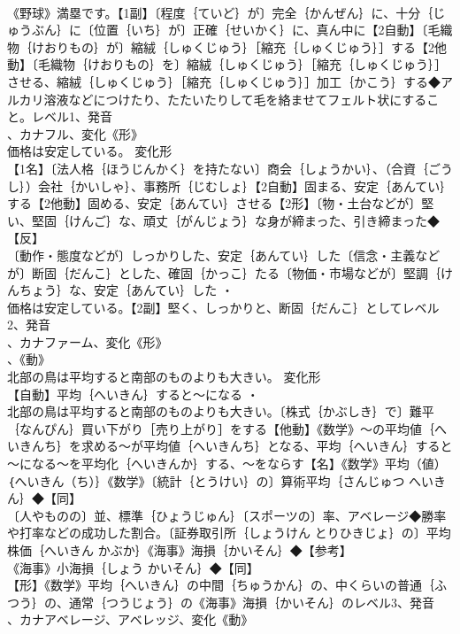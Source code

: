 \documentclass[8pt]{extreport}
\begin{document}
\begin{CJK}{UTF8}{min}
\\	《野球》満塁です。【1副】〔程度｛ていど｝が〕完全｛かんぜん｝に、十分｛じゅうぶん｝に〔位置｛いち｝が〕正確｛せいかく｝に、真ん中に【2自動】〔毛織物｛けおりもの｝が〕縮絨｛しゅくじゅう｝［縮充｛しゅくじゅう｝］する【2他動】〔毛織物｛けおりもの｝を〕縮絨｛しゅくじゅう｝［縮充｛しゅくじゅう｝］させる、縮絨｛しゅくじゅう｝［縮充｛しゅくじゅう｝］加工｛かこう｝する◆アルカリ溶液などにつけたり、たたいたりして毛を絡ませてフェルト状にすること。レベル1、発音
\\	、カナフル、変化《形》
\\	価格は安定している。	変化形 
\\	【1名】〔法人格｛ほうじんかく｝を持たない〕商会｛しょうかい｝、（合資｛ごうし｝）会社｛かいしゃ｝、事務所｛じむしょ｝【2自動】固まる、安定｛あんてい｝する【2他動】固める、安定｛あんてい｝させる【2形】〔物・土台などが〕堅い、堅固｛けんご｝な、頑丈｛がんじょう｝な身が締まった、引き締まった◆【反】
\\	〔動作・態度などが〕しっかりした、安定｛あんてい｝した〔信念・主義などが〕断固｛だんこ｝とした、確固｛かっこ｝たる〔物価・市場などが〕堅調｛けんちょう｝な、安定｛あんてい｝した ・
\\	価格は安定している。【2副】堅く、しっかりと、断固｛だんこ｝としてレベル2、発音
\\	、カナファーム、変化《形》
\\	、《動》
\\	北部の鳥は平均すると南部のものよりも大きい。	変化形 
\\	【自動】平均｛へいきん｝すると～になる ・
\\	北部の鳥は平均すると南部のものよりも大きい。〔株式｛かぶしき｝で〕難平｛なんぴん｝買い下がり［売り上がり］をする【他動】《数学》～の平均値｛へいきんち｝を求める～が平均値｛へいきんち｝となる、平均｛へいきん｝すると～になる～を平均化｛へいきんか｝する、～をならす【名】《数学》平均（値）｛へいきん（ち）｝《数学》〔統計｛とうけい｝の〕算術平均｛さんじゅつ へいきん｝◆【同】
\\	〔人やものの〕並、標準｛ひょうじゅん｝〔スポーツの〕率、アベレージ◆勝率や打率などの成功した割合。〔証券取引所｛しょうけん とりひきじょ｝の〕平均株価｛へいきん かぶか｝《海事》海損｛かいそん｝◆【参考】
\\	《海事》小海損｛しょう かいそん｝◆【同】
\\	【形】《数学》平均｛へいきん｝の中間｛ちゅうかん｝の、中くらいの普通｛ふつう｝の、通常｛つうじょう｝の《海事》海損｛かいそん｝のレベル3、発音
\\	、カナアベレージ、アベレッジ、変化《動》

\end{CJK}
\end{document}
